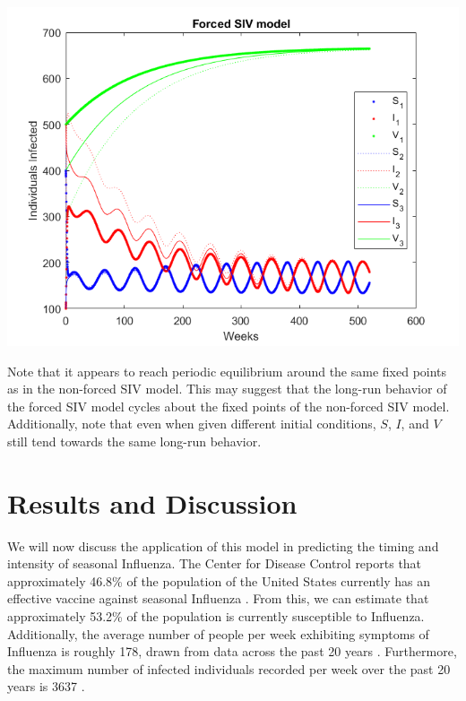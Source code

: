 \documentclass[12pt]{article}
\newenvironment{Figure}
  {\par\medskip\noindent\minipage{\linewidth}}
  {\endminipage\par\medskip}
\begin{document}
\begin{Figure}
    \centering
    \includegraphics[width = \linewidth]{example_forced_siv_end.png}
\end{Figure}

Note that it appears to reach periodic equilibrium around the same fixed points as in the non-forced SIV model. This may suggest that the long-run behavior of the forced SIV model cycles about the fixed points of the non-forced SIV model. Additionally, note that even when given different initial conditions, $S$, $I$, and $V$ still tend towards the same long-run behavior.



\section{Results and Discussion}

We will now discuss the application of this model in predicting the timing and intensity of seasonal Influenza. The Center for Disease Control reports that approximately 46.8\% of the population of the United States currently has an effective vaccine against seasonal Influenza \citep{flannery2017interim}. From this, we can estimate that approximately 53.2\% of the population is currently susceptible to Influenza. Additionally, the average number of people per week exhibiting symptoms of Influenza is roughly 178, drawn from data across the past 20 years \citep{centers2018weekly}. Furthermore, the maximum number of infected individuals recorded per week over the past 20 years is 3637 \citep{centers2018weekly}.
\end{document}
